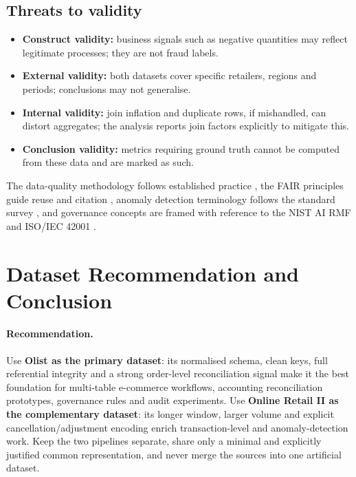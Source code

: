 \documentclass[11pt,a4paper]{article}
\begin{document}
\subsection*{Threats to validity}
\begin{itemize}
\item \textbf{Construct validity:} business signals such as negative quantities may reflect legitimate processes; they are not fraud labels.
\item \textbf{External validity:} both datasets cover specific retailers, regions and periods; conclusions may not generalise.
\item \textbf{Internal validity:} join inflation and duplicate rows, if mishandled, can distort aggregates; the analysis reports join factors explicitly to mitigate this.
\item \textbf{Conclusion validity:} metrics requiring ground truth cannot be computed from these data and are marked as such.
\end{itemize}
The data-quality methodology follows established practice \cite{batini2009}, the FAIR principles guide reuse and citation \cite{wilkinson2016}, anomaly detection terminology follows the standard survey \cite{chandola2009}, and governance concepts are framed with reference to the NIST AI RMF \cite{nistAirmf2023} and ISO/IEC 42001 \cite{iso42001}.

\section{Dataset Recommendation and Conclusion}
\paragraph{Recommendation.}
Use \textbf{Olist as the primary dataset}: its normalised schema, clean keys, full referential integrity and a strong order-level reconciliation signal make it the best foundation for multi-table e-commerce workflows, accounting reconciliation prototypes, governance rules and audit experiments. Use \textbf{Online Retail II as the complementary dataset}: its longer window, larger volume and explicit cancellation/adjustment encoding enrich transaction-level and anomaly-detection work. Keep the two pipelines separate, share only a minimal and explicitly justified common representation, and never merge the sources into one artificial dataset.
\end{document}
